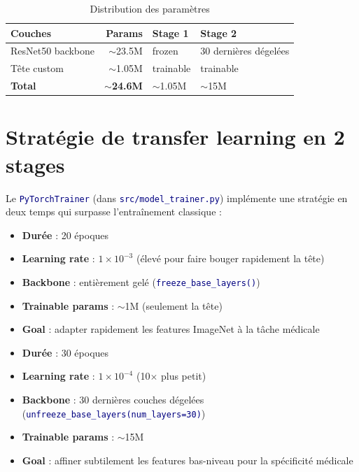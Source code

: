 \documentclass[11pt,a4paper,oneside]{report}
\newcommand{\code}[1]{\texttt{\textcolor{navy}{#1}}}
\newcommand{\rt}[1]{\textcolor{accentred}{#1}}
\newcommand{\og}[1]{\textcolor{accentorange}{#1}}
\newcommand{\gn}[1]{\textcolor{accentgreen}{#1}}
\begin{document}
\begin{table}[!htbp]
\centering
\caption{Distribution des paramètres}
\begin{tabular}{lrll}
\toprule
\textbf{Couches} & \textbf{Params} & \textbf{Stage 1} & \textbf{Stage 2} \\
\midrule
ResNet50 backbone   & $\sim$23.5M  & \rt{frozen} & \og{30 dernières dégelées} \\
Tête custom         & $\sim$1.05M  & \gn{trainable} & \gn{trainable} \\
\midrule
\textbf{Total}      & \textbf{$\sim$24.6M} & $\sim$1.05M & $\sim$15M \\
\bottomrule
\end{tabular}
\end{table}

\section{Stratégie de transfer learning en 2 stages}

Le \code{PyTorchTrainer} (dans \code{src/model\_trainer.py}) implémente une stratégie en deux temps qui surpasse l'entraînement classique :

\begin{infobox}
\begin{itemize}
\item \textbf{Durée} : 20 époques
\item \textbf{Learning rate} : $1\!\times\!10^{-3}$ (élevé pour faire bouger rapidement la tête)
\item \textbf{Backbone} : entièrement gelé (\code{freeze\_base\_layers()})
\item \textbf{Trainable params} : $\sim$1M (seulement la tête)
\item \textbf{Goal} : adapter rapidement les features ImageNet à la tâche médicale
\end{itemize}
\end{infobox}

\begin{infobox}
\begin{itemize}
\item \textbf{Durée} : 30 époques
\item \textbf{Learning rate} : $1\!\times\!10^{-4}$ (10$\times$ plus petit)
\item \textbf{Backbone} : 30 dernières couches dégelées (\code{unfreeze\_base\_layers(num\_layers=30)})
\item \textbf{Trainable params} : $\sim$15M
\item \textbf{Goal} : affiner subtilement les features bas-niveau pour la spécificité médicale
\end{itemize}
\end{infobox}
\end{document}
